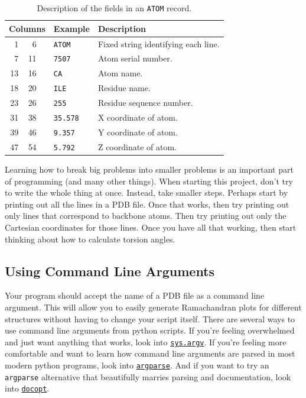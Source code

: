 \documentclass{article}
\newcommand{\module}[2]{\href{#2}{\texttt{#1}}}
\begin{document}
\begin{table}[h]
\centering
\begin{tabular}{r@{ - }rcll}
\toprule
\multicolumn{3}{l}{Columns} & Example         & Description                         \\
\midrule
 1 &  6 & & \texttt{ATOM}   & Fixed string identifying each line. \\
 7 & 11 & & \texttt{7507}   & Atom serial number.                 \\
13 & 16 & & \texttt{CA}     & Atom name.                          \\
18 & 20 & & \texttt{ILE}    & Residue name.                       \\
23 & 26 & & \texttt{255}    & Residue sequence number.            \\
31 & 38 & & \texttt{35.578} & X coordinate of atom.               \\
39 & 46 & & \texttt{9.357}  & Y coordinate of atom.               \\
47 & 54 & & \texttt{5.792}  & Z coordinate of atom.               \\
\bottomrule
\end{tabular}
\caption{Description of the fields in an \texttt{ATOM} record.}
\label{tab:pdb-atom-record}
\end{table}

Learning how to break big problems into smaller problems is an important part 
of programming (and many other things).  When starting this project, don't try 
to write the whole thing at once.  Instead, take smaller steps.  Perhaps start 
by printing out all the lines in a PDB file.  Once that works, then try 
printing out only lines that correspond to backbone atoms.  Then try printing 
out only the Cartesian coordinates for those lines.  Once you have all that 
working, then start thinking about how to calculate torsion angles.

\subsection{Using Command Line Arguments}

Your program should accept the name of a PDB file as a command line argument.  
This will allow you to easily generate Ramachandran plots for different 
structures without having to change your script itself.  There are several ways 
to use command line arguments from python scripts.  If you're feeling 
overwhelmed and just want anything that works, look into 
\module{sys.argv}{http://learnpythonthehardway.org/book/ex13.html}.  If you're 
feeling more comfortable and want to learn how command line arguments are 
parsed in most modern python programs, look into 
\module{argparse}{https://docs.python.org/2.7/howto/argparse.html}.  And if you 
want to try an \texttt{argparse} alternative that beautifully marries parsing 
and documentation, look into \module{docopt}{https://github.com/docopt/docopt}.
\end{document}
